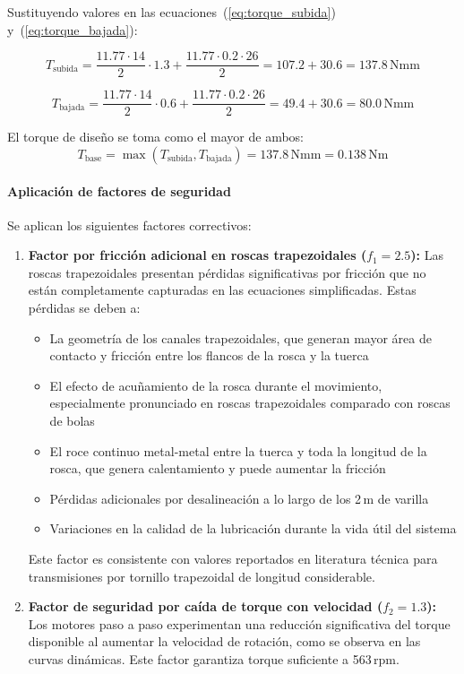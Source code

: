Sustituyendo valores en las ecuaciones~(\ref{eq:torque_subida}) y~(\ref{eq:torque_bajada}):

\[T_{\text{subida}} = \frac{11.77 \cdot 14}{2} \cdot 1.3 + \frac{11.77 \cdot 0.2 \cdot 26}{2} = 107.2 + 30.6 = 137.8\,\text{Nmm}\]

\[T_{\text{bajada}} = \frac{11.77 \cdot 14}{2} \cdot 0.6 + \frac{11.77 \cdot 0.2 \cdot 26}{2} = 49.4 + 30.6 = 80.0\,\text{Nmm}\]

El torque de diseño se toma como el mayor de ambos:
\[T_{\text{base}} = \max(T_{\text{subida}}, T_{\text{bajada}}) = 137.8\,\text{Nmm} = 0.138\,\text{Nm}\]

\paragraph{Aplicación de factores de seguridad}
Se aplican los siguientes factores correctivos:

\begin{enumerate}
    \item \textbf{Factor por fricción adicional en roscas trapezoidales ($f_1 = 2.5$):} Las roscas trapezoidales presentan pérdidas significativas por fricción que no están completamente capturadas en las ecuaciones simplificadas. Estas pérdidas se deben a:
    \begin{itemize}
        \item La geometría de los canales trapezoidales, que generan mayor área de contacto y fricción entre los flancos de la rosca y la tuerca
        \item El efecto de acuñamiento de la rosca durante el movimiento, especialmente pronunciado en roscas trapezoidales comparado con roscas de bolas
        \item El roce continuo metal-metal entre la tuerca y toda la longitud de la rosca, que genera calentamiento y puede aumentar la fricción
        \item Pérdidas adicionales por desalineación a lo largo de los 2\,m de varilla
        \item Variaciones en la calidad de la lubricación durante la vida útil del sistema
    \end{itemize}
    Este factor es consistente con valores reportados en literatura técnica para transmisiones por tornillo trapezoidal de longitud considerable.
    
    \item \textbf{Factor de seguridad por caída de torque con velocidad ($f_2 = 1.3$):} Los motores paso a paso experimentan una reducción significativa del torque disponible al aumentar la velocidad de rotación, como se observa en las curvas dinámicas. Este factor garantiza torque suficiente a 563\,rpm.
\end{enumerate}

